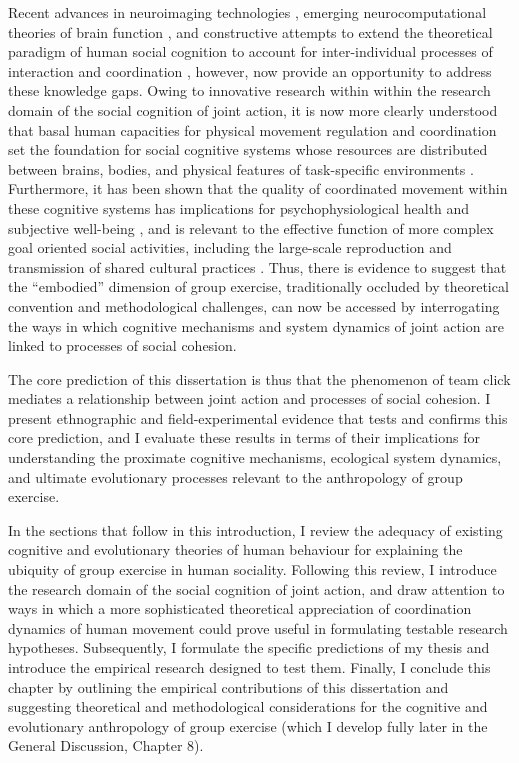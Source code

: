 Recent advances in neuroimaging technologies \citep{Frith2007}, emerging neurocomputational theories of brain function  \citep{Friston2010,Frith2010,Yufik2013}, and constructive attempts to extend the theoretical paradigm of human social cognition to account for inter-individual processes of interaction and coordination \citep{Sebanz2006,Dale2014}, however, now provide an opportunity to address these knowledge gaps.  Owing to innovative research within  within the research domain of the social cognition of joint action, it is now more clearly understood that basal human capacities for physical movement regulation and coordination set the foundation for social cognitive systems whose resources are distributed between brains, bodies, and physical features of task-specific environments \citep{Hutchins2000,Kirsh2006,Semin2008,Semin2012,Coey2012}.
Furthermore, it has been shown that the quality of coordinated movement within these cognitive systems has implications for psychophysiological health and subjective well-being \citep{Wheatley2012}, and is relevant to the effective function of more complex goal oriented social activities, including the large-scale reproduction and transmission of shared cultural practices \citep{Dunbar2012,Roepstorff2010,Claidiere2014,Launay2016}. Thus, there is evidence to suggest that the ``embodied'' dimension of group exercise, traditionally occluded by theoretical convention and methodological challenges, can now be accessed by  interrogating the ways in which cognitive mechanisms and system dynamics of joint action are linked to processes of social cohesion.

The core prediction of this dissertation is thus that the phenomenon of team click mediates a relationship between joint action and processes of social cohesion. I present ethnographic and field-experimental evidence that tests and confirms this core prediction, and I evaluate these results in terms of their implications for understanding the proximate cognitive mechanisms, ecological system dynamics, and ultimate evolutionary processes relevant to the anthropology of group exercise.

In the sections that follow in this introduction, I review the adequacy of existing cognitive and evolutionary theories of human behaviour for explaining the ubiquity of group exercise in human sociality.  Following this review, I introduce the research domain of the social cognition of joint action, and draw attention to ways in which a more sophisticated theoretical appreciation of coordination dynamics of human movement could prove useful in formulating testable research hypotheses. Subsequently, I formulate the specific predictions of my thesis and introduce the empirical research designed to test them.  Finally, I conclude this chapter by outlining the empirical contributions of this dissertation and suggesting theoretical and methodological considerations for the cognitive and evolutionary anthropology of group exercise (which I develop fully later in the General Discussion, Chapter 8).

